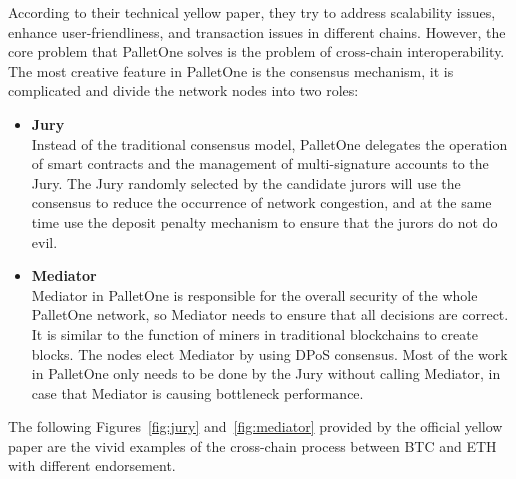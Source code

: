 \noindent According to their technical yellow paper, they try to address scalability issues, enhance user-friendliness, and transaction issues in different chains. However, the core problem that PalletOne solves is the problem of cross-chain interoperability. The most creative feature in PalletOne is the consensus mechanism, it is complicated and divide the network nodes into two roles:
\begin{itemize}
    \item \textbf{Jury} \\
    Instead of the traditional consensus model, PalletOne delegates the operation of smart contracts and the management of multi-signature accounts to the Jury. The Jury randomly selected by the candidate jurors will use the consensus to reduce the occurrence of network congestion, and at the same time use the deposit penalty mechanism to ensure that the jurors do not do evil.
    \item \textbf{Mediator}\\
    Mediator in PalletOne is responsible for the overall security of the whole PalletOne network, so Mediator needs to ensure that all decisions are correct. It is similar to the function of miners in traditional blockchains to create blocks. The nodes elect Mediator by using DPoS consensus. Most of the work in PalletOne only needs to be done by the Jury without calling Mediator, in case that Mediator is causing bottleneck performance.
\end{itemize}
\noindent The following Figures~\ref{fig:jury} and~\ref{fig:mediator} provided by the official yellow paper are the vivid examples of the cross-chain process between BTC and ETH with different endorsement.

